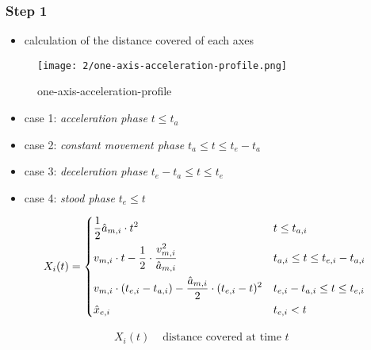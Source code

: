 \documentclass[%
  professionalfonts,%
  xcolor={%
    usenames,%
    dvipsnames,%
    svgnames,%
    table,%
    hyperref%
  }%
]{beamer}
\begin{document}
\subsubsection{Step 1}
\begin{frame}
\begin{itemize}
  \item calculation of the distance covered of each axes
\end{itemize}

\begin{figure}[h]
  \texttt{[image: 2/one-axis-acceleration-profile.png]}
  \caption{one-axis-acceleration-profile}
  \label{fig:ti-movement-cases}
\end{figure}

\begin{itemize}
\item case 1: \emph{acceleration phase} $t \leq t_{a}$
\item case 2: \emph{constant movement phase} $t_{a} \le t \leq t_{e} - t_{a}$
\item case 3: \emph{deceleration phase} $t_{e} - t_{a} \le t \leq t_{e}$
\item case 4: \emph{stood phase} $t_{e} \le t$
\end{itemize}

\end{frame}

\begin{frame}
\begin{equation*}
X_{i}(t) = 
\begin{dcases}
\frac{1}{2} \hat{a}_{m,i} \cdot t^2  & t \leq t_{a,i} \\
v_{m,i} \cdot t - \frac{1}{2} \cdot \frac{v_{m,i}^2}{\hat{a}_{m,i}} & t_{a,i} \le t \leq t_{e,i} - t_{a,i} \\
v_{m,i} \cdot (t_{e,i} - t_{a,i}) - \frac{\hat{a}_{m,i}}{2} \cdot (t_{e,i} - t)^2 & t_{e,i} - t_{a,i} \le t \leq t_{e,i}\\
\hat{x}_{e,i} & t_{e,i} < t\\
\end{dcases}
\end{equation*}

\begin{align*}
X_{i}(t) & \text{ distance covered at time $t$ } \\
\end{align*}
\end{frame}
\end{document}
